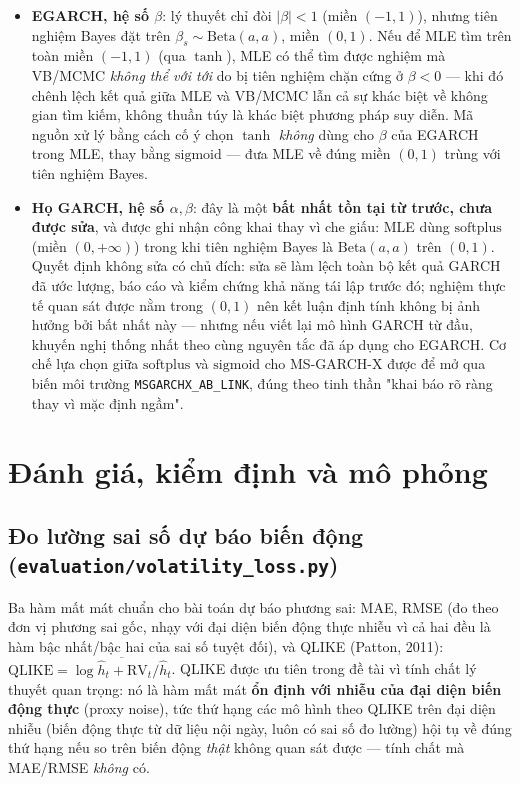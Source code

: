 \documentclass[11pt,a4paper]{article}
\newcommand{\code}[1]{\texttt{#1}}
\newcommand{\file}[1]{\texttt{#1}}
\begin{document}
\begin{itemize}
  \item \textbf{EGARCH, hệ số $\beta$}: lý thuyết chỉ đòi $|\beta|<1$ (miền
    $(-1,1)$), nhưng tiên nghiệm Bayes đặt trên $\beta_s\sim\mathrm{Beta}(a,a)$, miền
    $(0,1)$. Nếu để MLE tìm trên toàn miền $(-1,1)$ (qua $\tanh$), MLE có thể tìm
    được nghiệm mà VB/MCMC \emph{không thể với tới} do bị tiên nghiệm chặn cứng ở
    $\beta<0$ --- khi đó chênh lệch kết quả giữa MLE và VB/MCMC lẫn cả sự khác biệt
    về không gian tìm kiếm, không thuần túy là khác biệt phương pháp suy diễn. Mã
    nguồn xử lý bằng cách cố ý chọn $\tanh$ \emph{không} dùng cho $\beta$ của EGARCH
    trong MLE, thay bằng $\mathrm{sigmoid}$ --- đưa MLE về đúng miền $(0,1)$ trùng với
    tiên nghiệm Bayes.
  \item \textbf{Họ GARCH, hệ số $\alpha,\beta$}: đây là một \textbf{bất nhất tồn tại
    từ trước, chưa được sửa}, và được ghi nhận công khai thay vì che giấu: MLE dùng
    $\mathrm{softplus}$ (miền $(0,+\infty)$) trong khi tiên nghiệm Bayes là
    $\mathrm{Beta}(a,a)$ trên $(0,1)$. Quyết định không sửa có chủ đích: sửa sẽ làm
    lệch toàn bộ kết quả GARCH đã ước lượng, báo cáo và kiểm chứng khả năng tái lập
    trước đó; nghiệm thực tế quan sát được nằm trong $(0,1)$ nên kết luận định tính
    không bị ảnh hưởng bởi bất nhất này --- nhưng nếu viết lại mô hình GARCH từ đầu,
    khuyến nghị thống nhất theo cùng nguyên tắc đã áp dụng cho EGARCH. Cơ chế lựa
    chọn giữa $\mathrm{softplus}$ và $\mathrm{sigmoid}$ cho MS-GARCH-X được để mở qua
    biến môi trường \code{MSGARCHX\_AB\_LINK}, đúng theo tinh thần "khai báo rõ ràng
    thay vì mặc định ngầm".
\end{itemize}

\section{Đánh giá, kiểm định và mô phỏng}

\subsection{Đo lường sai số dự báo biến động (\file{evaluation/volatility\_loss.py})}

Ba hàm mất mát chuẩn cho bài toán dự báo phương sai: MAE, RMSE (đo theo đơn vị phương
sai gốc, nhạy với đại diện biến động thực nhiễu vì cả hai đều là hàm bậc nhất/bậc hai
của sai số tuyệt đối), và QLIKE (Patton, 2011): $\mathrm{QLIKE} = \overline{\log
\hat h_t + \mathrm{RV}_t/\hat h_t}$. QLIKE được ưu tiên trong đề tài vì tính chất lý
thuyết quan trọng: nó là hàm mất mát \textbf{ổn định với nhiễu của đại diện biến động
thực} (proxy noise), tức thứ hạng các mô hình theo QLIKE trên đại diện nhiễu (biến
động thực từ dữ liệu nội ngày, luôn có sai số đo lường) hội tụ về đúng thứ hạng nếu
so trên biến động \emph{thật} không quan sát được --- tính chất mà MAE/RMSE
\emph{không} có.
\end{document}
